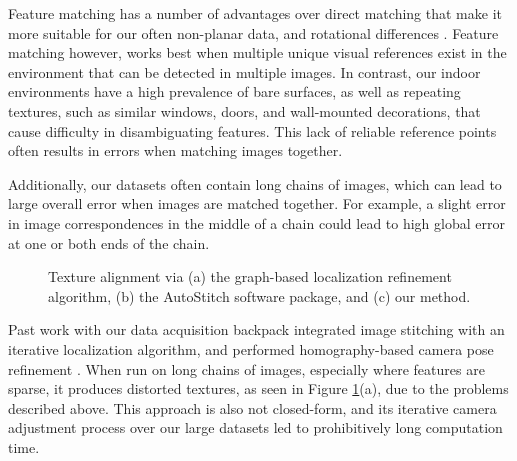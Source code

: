 \documentclass[]{spie}  %
\begin{document}
Feature matching has a number of advantages over direct matching that
make it more suitable for our often non-planar data, and rotational
differences \cite{szeliski2006image}. Feature matching however, works
best when multiple unique visual references exist in the environment
that can be detected in multiple images. In contrast, our indoor
environments have a high prevalence of bare surfaces, as well as
repeating textures, such as similar windows, doors, and wall-mounted
decorations, that cause difficulty in disambiguating features. This
lack of reliable reference points often results in errors when
matching images together.

Additionally, our datasets often contain long chains of images, which
can lead to large overall error when images are matched together. For
example, a slight error in image correspondences in the middle of a
chain could lead to high global error at one or both ends of the
chain.

\begin{figure}
  \centering

  \centering

  \centering {}

  \caption{Texture alignment via (a) the graph-based localization
    refinement algorithm, (b) the AutoStitch software package, and (c)
    our method.}
  \label{fig:mosaic3D}
\end{figure}


Past work with our data acquisition backpack integrated image
stitching with an iterative localization algorithm, and performed
homography-based camera pose refinement \cite{liu2010indoor}. When run
on long chains of images, especially where features are sparse, it
produces distorted textures, as seen in Figure \ref{fig:mosaic3D}(a),
due to the problems described above. This approach is also not
closed-form, and its iterative camera adjustment process over our
large datasets led to prohibitively long computation time.
\end{document}
